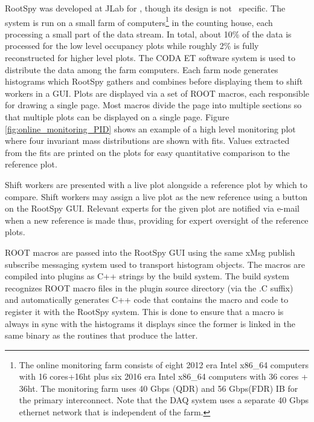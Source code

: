 RootSpy was developed at JLab for \GX, though its design is not \GX ~specific. The system is run on a small farm of computers\footnote{The online monitoring farm consists of eight 2012 era Intel x86\_64 computers with 16 cores+16ht plus six 2016 era Intel x86\_64 computers with 36 cores + 36ht. The monitoring farm uses 40 Gbps (QDR) and 56 Gbps(FDR) IB for the primary interconnect. Note that the DAQ system uses a separate 40 Gbps ethernet network that is independent of the farm.} in the counting house, each processing a small part of the data stream. In total, about 10\% of the data is processed for the low level occupancy plots while roughly 2\% is fully reconstructed for higher level plots. The CODA ET software system is used to distribute the data among the farm computers. Each farm node generates histograms which RootSpy gathers and combines before displaying them to shift workers in a GUI.
Plots are displayed via a set of ROOT macros, each responsible for drawing a single page. Most macros divide the page into multiple sections so that multiple plots can be displayed on a single page. Figure \ref{fig:online_monitoring_PID} shows an example of a high level monitoring plot where four invariant mass distributions are shown with fits. Values extracted from the fits are printed on the plots for easy quantitative comparison to the reference plot. 

Shift workers are presented with a live plot alongside a reference plot by which to compare. Shift workers may assign a live plot as the new reference using a button on the RootSpy GUI. Relevant experts for the given plot are notified via e-mail when a new reference is made thus, providing for expert oversight of the reference plots.

ROOT macros are passed into the RootSpy GUI using the same xMsg\cite{xmsg} publish subscribe messaging system used to transport histogram objects. The macros are compiled into plugins as C++ strings by the build system. The build system recognizes ROOT macro files in the plugin source directory (via the .C suffix) and automatically generates C++ code that contains the macro and code to register it with the RootSpy system. This is done to ensure that a macro is always in sync with the histograms it displays since the former is linked in the same binary as the routines that produce the latter.

